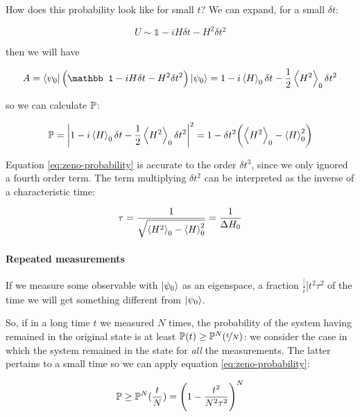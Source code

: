 \documentclass[main.tex]{subfiles}
\begin{document}
How does this probability look like for small \(t\)? We can expand, for a small \(\delta{t}\):

\begin{equation}
    U \sim \mathbb 1 -i H \delta{t} - H^2 \delta t^2
\end{equation}

then we will have

\begin{equation}
    A = \bra{\psi_0}  \qty(\mathbb 1 -i H \delta{t} - H^2 \delta t^2) \ket{\psi_0}
    = 1 -i \expval{H}_0 \delta{t} - \frac{1}{2}  \expval{H^2} _0 \delta t^2
\end{equation}

so we can calculate \(\P\):

\begin{equation} \label{eq:zeno-probability}
    \P = \abs{1 -i \expval{H}_0 \delta{t} - \frac{1}{2} \expval{H^2} _0 \delta t^2}^2
    = 1 - \delta t^2 \qty(\expval{H^2} _0 - \expval{H}_0^2)
\end{equation}

Equation \eqref{eq:zeno-probability} is accurate to the order \(\delta t^3\), since we only ignored a fourth order term. The term multiplying \(\delta t^2\) can be interpreted as the inverse of a characteristic time:

\begin{equation}
    \tau = \frac{1}{\sqrt{\expval{H^2} _0 - \expval{H}_0^2}} = \frac{1}{\Delta H _0}
\end{equation}

\paragraph{Repeated measurements}

If we measure some observable with \(\ket{\psi _0}\) as an eigenspace, a fraction \(\frac[i]{t^2}{\tau^2} \) of the time we will get something different from \(\ket{\psi _0} \).

So, if in a long time \(t\) we measured \(N\) times, the probability of the system having remained in the original state is at least \(\P (t) \geq \P^N(\frac[i]{t}{N} )\): we consider the case in which the system remained in the state for \emph{all} the measurements. The latter pertains to a small time so we can apply equation \eqref{eq:zeno-probability}:

\begin{equation}
    \P \geq \P^N(\frac{t}{N}) = \qty(1- \frac{t^2}{N^2 \tau^2} )^N
\end{equation}
\end{document}
